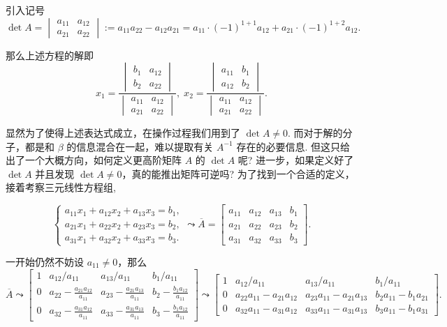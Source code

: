\documentclass[10pt,openany]{article}
\theoremstyle{thmstyle} %
\theoremstyle{defstyle} %
\theoremstyle{prostyle} %
\theoremstyle{exastyle}
\theoremstyle{remstyle}
\begin{document}
引入记号
\[ \det A=\begin{vmatrix}
	a_{11} & a_{12} \\ a_{21} & a_{22}
\end{vmatrix}:= a_{11}a_{22}-a_{12}a_{21}=a_{11}\cdot (-1)^{1+1}a_{12}+a_{21} \cdot (-1)^{1+2}a_{12}. \]

那么上述方程的解即
\[ x_1=\frac{\begin{vmatrix}
		b_1 & a_{12} \\ b_2 & a_{22}
\end{vmatrix}}{\begin{vmatrix}
		a_{11} & a_{12} \\ a_{21} & a_{22}
\end{vmatrix}}, \; x_2=\frac{\begin{vmatrix}
a_{11} & b_1 \\ a_{12} & b_2
\end{vmatrix}}{\begin{vmatrix}
a_{11} & a_{12} \\ a_{21} & a_{22}
\end{vmatrix}}. \]

显然为了使得上述表达式成立，在操作过程我们用到了 \( \det A \neq 0 \). 而对于解的分子，都是和 \( \beta \) 的信息混合在一起，难以提取有关 \( A^{-1} \) 存在的必要信息. 但这只给出了一个大概方向，如何定义更高阶矩阵 \( A \) 的 \(  \det A \) 呢? 进一步，如果定义好了 \( \det A \) 并且发现 \( \det A \neq 0 \)，真的能推出矩阵可逆吗? 为了找到一个合适的定义，接着考察三元线性方程组,

\[ \left\{ \begin{array}{l}
	a_{11}x_1+a_{12}x_2+a_{13}x_3=b_1, \\
	a_{21}x_1+a_{22}x_2+a_{23}x_3=b_2, \\
	a_{31}x_1+a_{32}x_2+a_{33}x_3=b_3.
\end{array}\right. \leadsto \overline{A}=\begin{bmatrix}
	a_{11} & a_{12} & a_{13} & b_1 \\
	a_{21} & a_{22} & a_{23} & b_2 \\
	a_{31} & a_{32} & a_{33} & b_3 
\end{bmatrix}. \]

一开始仍然不妨设 \( a_{11} \neq 0 \)，那么
\[ \overline{A} \leadsto  \begin{bmatrix}
	1 & a_{12}/a_{11} & a_{13}/a_{11} & b_1/a_{11} \\[2ex]
	0 & a_{22}-\frac{a_{21}a_{12}}{a_{11}} & a_{23}-\frac{a_{21}a_{13}}{a_{11}} & b_2-\frac{b_1a_{12}}{a_{11}} \\[2ex]
	0 & a_{32}-\frac{a_{31}a_{12}}{a_{11}} & a_{33}-\frac{a_{31}a_{13}}{a_{11}} & b_3-\frac{b_1a_{12}}{a_{11}}
\end{bmatrix} \leadsto \begin{bmatrix}
1 & a_{12}/a_{11} & a_{13}/a_{11} & b_1/a_{11} \\[2ex]
0 & a_{22} a_{11} - a_{21} a_{12} & a_{23} a_{11} - a_{21} a_{13} & b_2 a_{11} - b_1 a_{21} \\[2ex]
0 & a_{32} a_{11} - a_{31} a_{12} & a_{33} a_{11} - a_{31} a_{13} & b_3 a_{11} - b_1 a_{31}
\end{bmatrix}. \]
\end{document}
